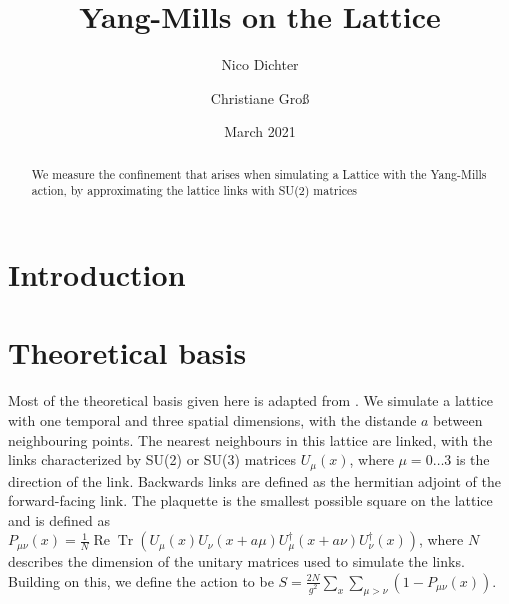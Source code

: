 \documentclass[%
 reprint,
 amsmath,amssymb,
 aps,
]{revtex4-1}
\DeclareMathOperator{\Tr}{Tr}
\renewcommand{\Re}{\operatorname{Re}}
\begin{document}
\title{Yang-Mills on the Lattice}%

\author{Nico Dichter}
\author{Christiane Gro\ss{}}


\date{March 2021}%

\begin{abstract}
	We measure the confinement that arises when simulating a Lattice with the Yang-Mills action, by approximating the lattice links with SU(2) matrices
\end{abstract}
\maketitle


\section{Introduction}


\section{Theoretical basis}


Most of the theoretical basis given here is adapted from \citet{lepagelqcd}. We simulate a lattice with one temporal and three spatial dimensions, with the distande $a$ between neighbouring points. The nearest neighbours in this lattice are linked, with the links characterized by SU(2) or SU(3) matrices $U_\mu(x)$, where $\mu=0\dots3$ is the direction of the link. Backwards links are defined as the hermitian adjoint of the forward-facing link. The plaquette is the smallest possible square on the lattice and is defined as $P_{\mu\nu}(x)=\frac{1}{N}\Re\Tr\left(U_\mu(x)U_\nu(x+a\mu)U_\mu^\dagger(x+a\nu)U^\dagger_\nu(x)\right)$, where $N$ describes the dimension of the unitary matrices used to simulate the links. Building on this, we define the action to be $S=\frac{2N}{g^2}\sum_{x}\sum_{\mu>\nu}\left(1-P_{\mu\nu}(x)\right)$.
\end{document}
